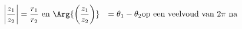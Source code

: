 \begin{align}
\left| \frac{z_1}{z_2} \right| &= \frac{r_1}{r_2}    \text{~en~}
\Arg{\left( \frac{z_1}{z_2} \right)} &= \theta_1 - \theta_2  \text{op een
  veelvoud van $2\pi$ na} 
\end{align}

